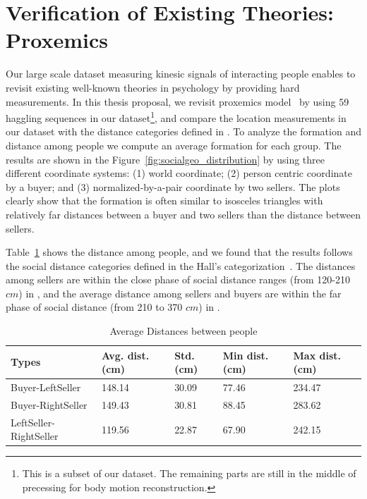 \section{Verification of Existing Theories: Proxemics}
Our large scale dataset measuring kinesic signals of interacting people enables to revisit existing well-known theories in psychology by providing hard measurements. In this thesis proposal, we revisit proxemics model~\cite{Hall66} by using 59 haggling sequences in our dataset\footnote{This is a subset of our dataset. The remaining parts are still in the middle of precessing for body motion reconstruction.}, and compare the location measurements in our dataset with the distance categories defined in \cite{Hall66}. To analyze the formation and distance among people we compute an average formation for each group. The results are shown in the Figure~\ref{fig:socialgeo_distribution} by using three different coordinate systems: (1) world coordinate;  (2) person centric coordinate by a buyer; and (3) normalized-by-a-pair coordinate by two sellers. The plots clearly show that the formation is often similar to isosceles triangles with relatively far distances between a buyer and two sellers than the distance between sellers.

Table~\ref{table:proxemics} shows the distance among people, and we found that the results follows the social distance categories defined in the Hall's categorization~\cite{Hall66}. The distances among sellers are within the close phase of social distance ranges (from 120-210 $cm$) in \cite{Hall66}, and the average distance among sellers and buyers are within the far phase of social distance (from 210 to 370 $cm$) in \cite{Hall66}. %



\begin{table}[]
	\centering
	\caption{Average Distances between people}
	\label{table:proxemics}
	\begin{tabular}{l| l| l| l| l}
		\hline
		Types & Avg. dist. (cm) & Std.(cm) & Min dist. (cm)  & Max dist. (cm)\\
		\hline
		Buyer-LeftSeller & 148.14 & 30.09 & 77.46 & 234.47 \\
		\hline
		Buyer-RightSeller & 149.43 & 30.81 & 88.45  & 283.62 \\
		\hline
		LeftSeller-RightSeller& 119.56 & 22.87  & 67.90  & 242.15 
	\end{tabular}
\end{table}


